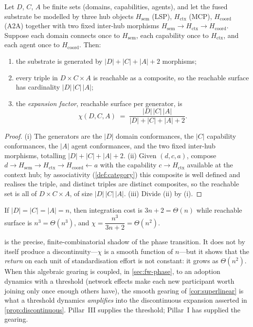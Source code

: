 \begin{theorem}[Decoupling]
\label{thm:decoupling}
Let $D$, $C$, $A$ be finite sets (domains, capabilities, agents), and let the
fused substrate be modelled by three hub objects $H_{\mathrm{sem}}$ (LSP),
$H_{\mathrm{ctx}}$ (MCP), $H_{\mathrm{coord}}$ (A2A) together with two fixed
inter-hub morphisms $H_{\mathrm{sem}}\to H_{\mathrm{ctx}}\to H_{\mathrm{coord}}$.
Suppose each domain connects once to $H_{\mathrm{sem}}$, each capability once to
$H_{\mathrm{ctx}}$, and each agent once to $H_{\mathrm{coord}}$. Then:
\begin{enumerate}[label=(\roman*),leftmargin=2.2em]
  \item the substrate is generated by $|D|+|C|+|A|+2$ morphisms;
  \item every triple in $D\times C\times A$ is reachable as a composite, so the
  reachable surface has cardinality $|D|\,|C|\,|A|$;
  \item the \emph{expansion factor}, reachable surface per generator, is
  \[
  \chi(D,C,A)\;=\;\frac{|D|\,|C|\,|A|}{|D|+|C|+|A|+2}.
  \]
\end{enumerate}
\end{theorem}
\begin{proof}
(i) The generators are the $|D|$ domain conformances, the $|C|$ capability
conformances, the $|A|$ agent conformances, and the two fixed inter-hub
morphisms, totalling $|D|+|C|+|A|+2$. (ii) Given $(d,c,a)$, compose
$d\to H_{\mathrm{sem}}\to H_{\mathrm{ctx}}\to H_{\mathrm{coord}}\leftarrow a$ with
the capability $c\to H_{\mathrm{ctx}}$ available at the context hub; by
associativity (\cref{def:category}) this composite is well defined and realises
the triple, and distinct triples are distinct composites, so the reachable set is
all of $D\times C\times A$, of size $|D|\,|C|\,|A|$. (iii) Divide (ii) by (i).
\end{proof}

\begin{corollary}
\label{cor:superlinear}
If $|D|=|C|=|A|=n$, then integration cost is $3n+2=\Theta(n)$ while reachable
surface is $n^{3}=\Theta(n^{3})$, and $\chi=\dfrac{n^{3}}{3n+2}=\Theta(n^{2})$.
\end{corollary}

 is the precise, finite-combinatorial shadow of the phase
transition. It does not by itself produce a discontinuity---$\chi$ is a smooth
function of $n$---but it shows that the \emph{return} on each unit of
standardisation effort is not constant: it grows as $\Theta(n^2)$. When this
algebraic gearing is coupled, in \cref{sec:fw-phase}, to an adoption dynamics with
a threshold (network effects make each new participant worth joining only once
enough others have), the smooth gearing of \cref{cor:superlinear} is what a
threshold dynamics \emph{amplifies} into the discontinuous expansion asserted in
\cref{prop:discontinuous}. Pillar~III supplies the threshold; Pillar~I has
supplied the gearing.
